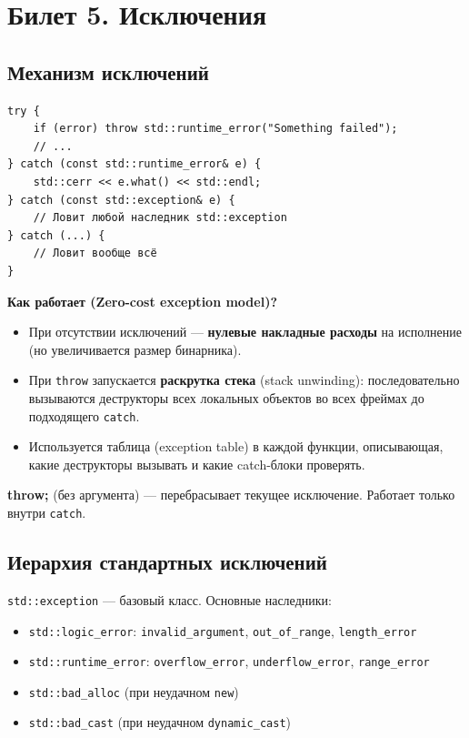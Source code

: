 \documentclass[12pt,a4paper]{article}
\begin{document}
\section{Билет 5. Исключения}

\subsection{Механизм исключений}

\begin{lstlisting}
try {
    if (error) throw std::runtime_error("Something failed");
    // ...
} catch (const std::runtime_error& e) {
    std::cerr << e.what() << std::endl;
} catch (const std::exception& e) {
    // Ловит любой наследник std::exception
} catch (...) {
    // Ловит вообще всё
}
\end{lstlisting}

\textbf{Как работает (Zero-cost exception model)?}
\begin{itemize}
    \item При отсутствии исключений --- \textbf{нулевые накладные расходы} на исполнение (но увеличивается размер бинарника).
    \item При \texttt{throw} запускается \textbf{раскрутка стека} (stack unwinding): последовательно вызываются деструкторы всех локальных объектов во всех фреймах до подходящего \texttt{catch}.
    \item Используется таблица (exception table) в каждой функции, описывающая, какие деструкторы вызывать и какие catch-блоки проверять.
\end{itemize}

\textbf{throw;} (без аргумента) --- перебрасывает текущее исключение. Работает только внутри \texttt{catch}.

\subsection{Иерархия стандартных исключений}

\texttt{std::exception} --- базовый класс. Основные наследники:
\begin{itemize}
    \item \texttt{std::logic\_error}: \texttt{invalid\_argument}, \texttt{out\_of\_range}, \texttt{length\_error}
    \item \texttt{std::runtime\_error}: \texttt{overflow\_error}, \texttt{underflow\_error}, \texttt{range\_error}
    \item \texttt{std::bad\_alloc} (при неудачном \texttt{new})
    \item \texttt{std::bad\_cast} (при неудачном \texttt{dynamic\_cast})
\end{itemize}
\end{document}
